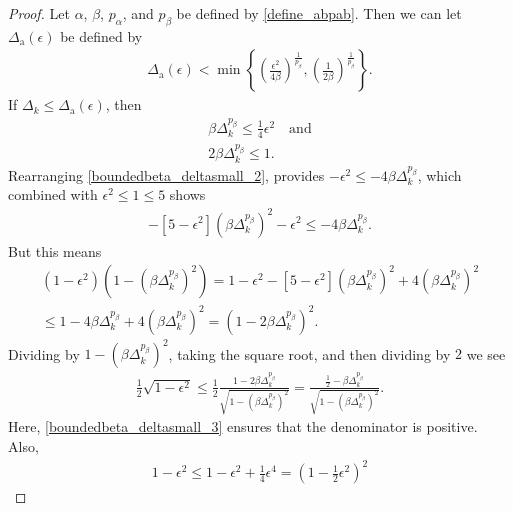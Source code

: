 \documentclass{article}
\theoremstyle{case}
\numberwithin{theorem}{subsection}
\newcommand{\dacco}{{\Delta_{\textrm{a}}}}
\newcommand{\dk}{\Delta_k}
\newcommand{\minangledelta}{{\Delta_{\alpha^{\star}}}}
\begin{document}
\begin{proof}
Let $\alpha$, $\beta$, $p_{\alpha}$, and $p_{\beta}$ be defined by \cref{define_abpab}.
Then we can let $\dacco(\epsilon)$ be defined by
\begin{align}
\dacco(\epsilon) < \min\left\{
\left(\frac {\epsilon ^2} {4\beta} \right)^{\frac 1 {p_{\beta}}},
\left(\frac 1 {2\beta}\right)^{\frac 1 {p_{\beta}}}
\right\}\label{define_delta_accuracy_old}.
\end{align}
If $\dk \le \dacco(\epsilon)$, then
\begin{align}
\beta\dk^{p_{\beta}} \le \frac 1 {4} \epsilon^2 \quad \textrm{and}\label{boundedbeta_deltasmall_2} \\
2\beta\dk^{p_{\beta}} \le 1. \label{boundedbeta_deltasmall_3}
\end{align}
Rearranging \cref{boundedbeta_deltasmall_2}, provides $-\epsilon^2 \le -4\beta\dk^{p_{\beta}}$,
which combined with $\epsilon ^2 \le 1 \le 5$ shows
\begin{align*}
-\left[5- \epsilon^2\right]\left(\beta\dk^{p_{\beta}}\right)^2  - \epsilon^2 \le -4\beta\dk^{p_{\beta}}.
\end{align*}
But this means
\begin{align*}
\left(1 - \epsilon^2\right)\left(1 - \left(\beta\dk^{p_{\beta}}\right)^2\right) 
= 1 - \epsilon^2 - \left[5 - \epsilon^2\right]\left(\beta\dk^{p_{\beta}}\right)^2 + 4\left(\beta\dk^{p_{\beta}}\right)^2 \\
\le 1 - 4\beta\dk^{p_{\beta}} + 4\left(\beta\dk^{p_{\beta}}\right)^2 = \left(1 - 2\beta\dk^{p_{\beta}}\right)^2.
\end{align*}
Dividing by $1 - \left(\beta\dk^{p_{\beta}}\right)^2$, taking the square root, and then dividing by $2$ we see
\begin{align}
\frac 1 2 \sqrt{1 - \epsilon^2} \le \frac 1 2 \frac{1 -2\beta\dk^{p_{\beta}}}{\sqrt{1 - \left(\beta\dk^{p_{\beta}}\right)^2}}
= \frac{\frac 1 2 -\beta\dk^{p_{\beta}}}{\sqrt{1 - \left(\beta\dk^{p_{\beta}}\right)^2}}. \label{boundedbeta_eqn1}
\end{align}
Here, \cref{boundedbeta_deltasmall_3} ensures that the denominator is positive.
Also,
\begin{align*}
1 - \epsilon^2 \le 1 - \epsilon^2 + \frac 1 4 \epsilon^4 
= \left(1 - \frac 1 2 \epsilon^2 \right)^2 

\end{align*}
\end{proof}
\end{document}
